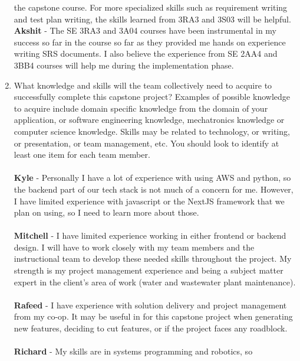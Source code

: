 \documentclass[12pt]{article}
\begin{document}
\begin{enumerate}
      the capstone course. For more specialized skills such as
      requirement writing
      and test plan writing, the skills learned from 3RA3 and 3S03 will be
      helpful.
      \\
      \textbf{Akshit} - The SE 3RA3 and 3A04 courses have been
      instrumental in my success
      so far in the course so far as they provided me hands on
      experience writing SRS
      documents. I also believe the experience from SE 2AA4 and 3BB4
      courses will help me during
      the implementation phase.\\
    \item What knowledge and skills will the team collectively need to
      acquire to successfully complete this capstone project?  Examples
      of possible knowledge to acquire include domain specific
      knowledge from the domain of your application, or software
      engineering knowledge, mechatronics knowledge or computer science
      knowledge.  Skills may be related to technology, or writing, or
      presentation, or team management, etc.  You should look to
      identify at least one item for each team member. \\
      \\
      \textbf{Kyle} - Personally I have a lot of experience with using
      AWS and python, so the backend part of our tech stack is not much
      of a concern for me. However, I have limited experience with
      javascript or the NextJS framework that we plan on using, so I
      need to learn more about those.\\
      \\
      \textbf{Mitchell} - I have limited experience working in either
      frontend or backend design. I will have to work closely with my
      team members and the instructional team to develop these needed
      skills throughout the project. My strength is my project
      management experience and being a subject matter expert in the
      client's area of work (water and wastewater plant maintenance).\\
      \\
      \textbf{Rafeed} - I have experience with solution delivery and
      project management from my co-op. It may be useful in for this
      capstone project when generating new features, deciding to cut
      features, or if the project faces any roadblock. \\
      \\
      \textbf{Richard} - My skills are in systems programming and robotics, so

\end{enumerate}
\end{document}
